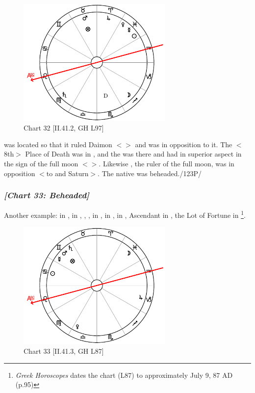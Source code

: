 \clearpage
\begin{figure}
\centering
\includegraphics[width=0.68\textwidth]{charts/2_41_2}
\caption{Chart 32 [II.41.2, GH L97]}
\label{fig:chart32}
\end{figure} 

\noindent \Mars\xspace was located so that it ruled Daimon $<$\Scorpio$>$ and was in opposition to it. The $<$8th$>$ Place of Death was in \Sagittarius, and the \Moon\xspace was there and had \Saturn\xspace in superior aspect in the sign of the full moon $<$\Virgo$>$. Likewise \Mercury, the ruler of the full moon, was in opposition $<$to \Virgo\xspace and Saturn$>$. The native was beheaded./123P/ 
\newpage
\subsubsection{\textit{[Chart 33: Beheaded]}}
Another example: \Sun\xspace in \Cancer, \Moon\xspace in \Pisces, \Saturn, \Mars, \Mercury\xspace in \Gemini, \Jupiter\xspace in \Capricorn, \Venus\xspace in \Leo, Ascendant in \Libra, the Lot of Fortune in \Gemini
\footnote{\textit{Greek Horoscopes} dates the chart (L87) to approximately July 9, 87 AD (p.95)}.

\clearpage
\begin{figure}
\centering
\includegraphics[width=0.68\textwidth]{charts/2_41_3}
\caption{Chart 33 [II.41.3, GH L87]}
\label{fig:chart33}
\end{figure} 

